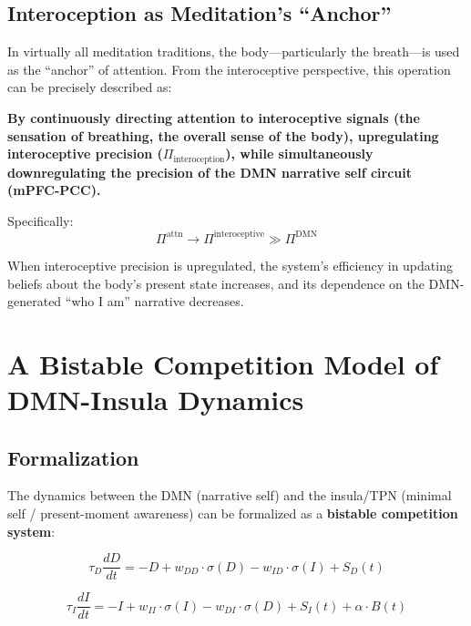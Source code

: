 \documentclass[11pt,a4paper]{article}
\begin{document}
\subsection{Interoception as Meditation's ``Anchor''}

In virtually all meditation traditions, the body---particularly the breath---is used as the ``anchor'' of attention. From the interoceptive perspective, this operation can be precisely described as:

\textbf{By continuously directing attention to interoceptive signals (the sensation of breathing, the overall sense of the body), upregulating interoceptive precision ($\Pi_{\text{interoception}}$), while simultaneously downregulating the precision of the DMN narrative self circuit (mPFC-PCC).}

Specifically:
\begin{equation}
\Pi^{\text{attn}} \rightarrow \Pi^{\text{interoceptive}} \gg \Pi^{\text{DMN}}
\end{equation}

When interoceptive precision is upregulated, the system's efficiency in updating beliefs about the body's present state increases, and its dependence on the DMN-generated ``who I am'' narrative decreases.

\section{A Bistable Competition Model of DMN-Insula Dynamics}

\subsection{Formalization}

The dynamics between the DMN (narrative self) and the insula/TPN (minimal self / present-moment awareness) can be formalized as a \textbf{bistable competition system}:

\begin{equation}
\tau_D \frac{dD}{dt} = -D + w_{DD} \cdot \sigma(D) - w_{ID} \cdot \sigma(I) + S_D(t)
\label{eq:dmn_dyn}
\end{equation}

\begin{equation}
\tau_I \frac{dI}{dt} = -I + w_{II} \cdot \sigma(I) - w_{DI} \cdot \sigma(D) + S_I(t) + \alpha \cdot B(t)
\label{eq:insula_dyn}
\end{equation}
\end{document}
